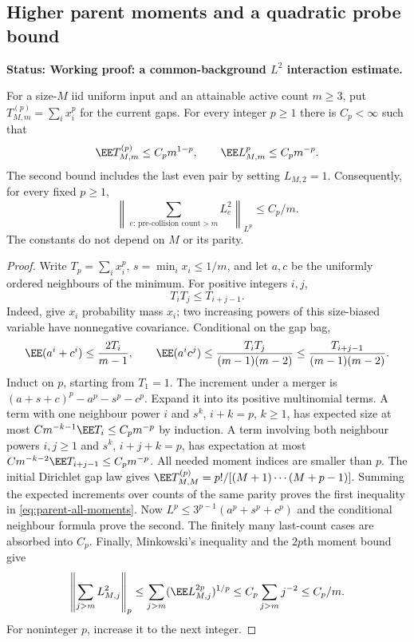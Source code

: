 \documentclass[11pt,letterpaper]{article}
\newcommand{\status}[1]{\textbf{Status: #1.}}
\begin{document}
\subsection{Higher parent moments and a quadratic probe bound}
\label{sec:parent-higher-moments}

\status{Working proof: a common-background $L^2$ interaction estimate}

\begin{lemma}
\label{lem:parent-all-moments}
For a size-$M$ iid uniform input and an attainable active count
$m\ge3$, put $T_{M,m}^{(p)}=\sum_i x_i^p$ for the current gaps.
For every integer $p\ge1$ there is $C_p<\infty$ such that
\begin{equation}\label{eq:parent-all-moments}
 \EE T_{M,m}^{(p)}\le C_p m^{1-p},\qquad
 \EE L_{M,m}^p\le C_p m^{-p}.
\end{equation}
The second bound includes the last even pair by setting
$L_{M,2}=1$. Consequently, for every fixed $p\ge1$,
\begin{equation}\label{eq:parent-square-sum-Lp}
 \left\|\sum_{e:\,\text{pre-collision count}>m}L_e^2
                                      \right\|_{L^p}\le C_p/m.
\end{equation}
The constants do not depend on $M$ or its parity.
\end{lemma}
\begin{proof}
Write $T_p=\sum_i x_i^p$, $s=\min_i x_i\le1/m$, and let
$a,c$ be the uniformly ordered neighbours of the minimum.
For positive integers $i,j$,
\begin{equation}\label{eq:gap-power-product}
 T_iT_j\le T_{i+j-1}.
\end{equation}
Indeed, give $x_i$ probability mass $x_i$; two increasing powers
of this size-biased variable have nonnegative covariance.
Conditional on the gap bag,
\[
 \EE(a^i+c^i)\le\frac{2T_i}{m-1},\qquad
 \EE(a^ic^j)
   \le\frac{T_iT_j}{(m-1)(m-2)}
   \le\frac{T_{i+j-1}}{(m-1)(m-2)}.
\]
Induct on $p$, starting from $T_1=1$. The increment under a
merger is $(a+s+c)^p-a^p-s^p-c^p$. Expand it into its positive
multinomial terms. A term with one neighbour power $i$ and
$s^k$, $i+k=p$, $k\ge1$, has expected size at most
$C m^{-k-1}\EE T_i\le C_p m^{-p}$ by induction.
A term involving both neighbour powers $i,j\ge1$ and $s^k$,
$i+j+k=p$, has expectation at most
$C m^{-k-2}\EE T_{i+j-1}\le C_p m^{-p}$.
All needed moment indices are smaller than $p$.
The initial Dirichlet gap law gives
$\EE T_{M,M}^{(p)}=p!/[(M+1)\cdots(M+p-1)]$.
Summing the expected increments over counts of the same parity
proves the first inequality in \eqref{eq:parent-all-moments}.
Now $L^p\le3^{p-1}(a^p+s^p+c^p)$ and the conditional neighbour
formula prove the second. The finitely many last-count cases
are absorbed into $C_p$.
Finally, Minkowski's inequality and the $2p$th moment bound give
\[
 \left\|\sum_{j>m}L_{M,j}^2\right\|_p
       \le\sum_{j>m}(\EE L_{M,j}^{2p})^{1/p}
       \le C_p\sum_{j>m}j^{-2}\le C_p/m.
\]
For noninteger $p$, increase it to the next integer.
\end{proof}
\end{document}
